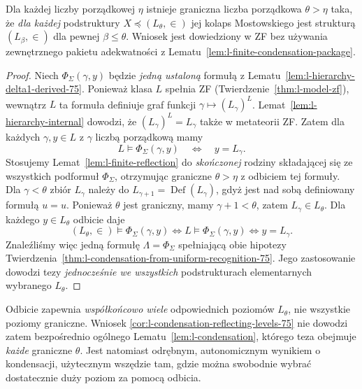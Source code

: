 \begin{wniosek}
\label{cor:l-condensation-reflecting-levels-75}
Dla każdej liczby porządkowej $\eta$ istnieje
graniczna liczba porządkowa $\theta>\eta$ taka, że
\emph{dla każdej} podstruktury
$X\preccurlyeq(L_\theta,\in)$ jej kolaps Mostowskiego
jest strukturą $(L_\beta,\in)$ dla pewnej
$\beta\le\theta$. Wniosek jest dowiedziony w ZF
bez używania zewnętrznego pakietu adekwatności
z Lematu~\ref{lem:l-finite-condensation-package}.
\end{wniosek}
\begin{proof}
Niech $\Phi_{\Sigma}(\gamma,y)$ będzie
\emph{jedną ustaloną} formułą z
Lematu~\ref{lem:l-hierarchy-delta1-derived-75}.
Ponieważ klasa $L$ spełnia ZF
(Twierdzenie~\ref{thm:l-model-zf}), wewnątrz $L$
ta formuła definiuje graf funkcji
$\gamma\mapsto(L_\gamma)^L$.
Lemat~\ref{lem:l-hierarchy-internal} dowodzi, że
$(L_\gamma)^L=L_\gamma$ także w metateorii ZF.
Zatem dla każdych $\gamma,y\in L$ z $\gamma$
liczbą porządkową mamy
\[
L\models\Phi_{\Sigma}(\gamma,y)
\quad\Longleftrightarrow\quad y=L_\gamma.
\]
Stosujemy Lemat~\ref{lem:l-finite-reflection} do
\emph{skończonej} rodziny składającej się ze
wszystkich podformuł $\Phi_{\Sigma}$, otrzymując
graniczne $\theta>\eta$ z odbiciem tej formuły.
Dla $\gamma<\theta$ zbiór $L_\gamma$ należy do
$L_{\gamma+1}=\operatorname{Def}(L_\gamma)$,
gdyż jest nad sobą definiowany formułą $u=u$.
Ponieważ $\theta$ jest graniczny, mamy
$\gamma+1<\theta$, zatem $L_\gamma\in L_\theta$.
Dla każdego $y\in L_\theta$ odbicie daje
\[
(L_\theta,\in)\models\Phi_{\Sigma}(\gamma,y)
\iff L\models\Phi_{\Sigma}(\gamma,y)
\iff y=L_\gamma.
\]
Znaleźliśmy więc jedną formułę $\Lambda=\Phi_{\Sigma}$
spełniającą obie hipotezy
Twierdzenia~\ref{thm:l-condensation-from-uniform-recognition-75}.
Jego zastosowanie dowodzi tezy \emph{jednocześnie
we wszystkich} podstrukturach elementarnych
wybranego $L_\theta$.
\end{proof}
\begin{uwaga}
\label{rem:l-reflecting-levels-not-all-75}
Odbicie zapewnia \emph{współkońcowo wiele}
odpowiednich poziomów $L_\theta$, nie wszystkie
poziomy graniczne. Wniosek
\ref{cor:l-condensation-reflecting-levels-75}
nie dowodzi zatem bezpośrednio ogólnego
Lematu~\ref{lem:l-condensation}, którego teza
obejmuje \emph{każde} graniczne $\theta$.
Jest natomiast odrębnym, autonomicznym wynikiem
o kondensacji, użytecznym wszędzie tam, gdzie
można swobodnie wybrać dostatecznie duży poziom
za pomocą odbicia.
\end{uwaga}

